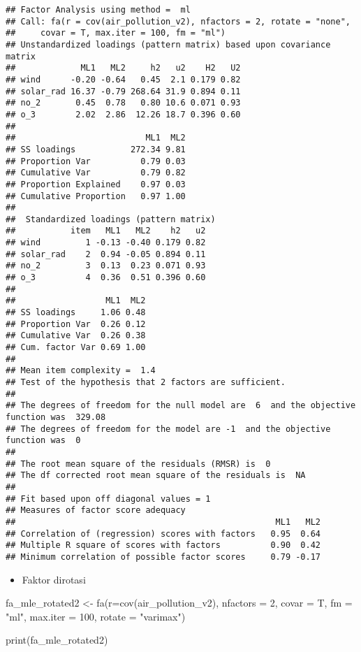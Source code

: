 \documentclass[
]{article}
\newenvironment{Shaded}{\begin{snugshade}}{\end{snugshade}}
\newcommand{\AttributeTok}[1]{\textcolor[rgb]{0.77,0.63,0.00}{#1}}
\newcommand{\DecValTok}[1]{\textcolor[rgb]{0.00,0.00,0.81}{#1}}
\newcommand{\FunctionTok}[1]{\textcolor[rgb]{0.00,0.00,0.00}{#1}}
\newcommand{\NormalTok}[1]{#1}
\newcommand{\OtherTok}[1]{\textcolor[rgb]{0.56,0.35,0.01}{#1}}
\newcommand{\StringTok}[1]{\textcolor[rgb]{0.31,0.60,0.02}{#1}}
\providecommand{\tightlist}{%
  \setlength{\itemsep}{0pt}\setlength{\parskip}{0pt}}
\begin{document}
\begin{verbatim}
## Factor Analysis using method =  ml
## Call: fa(r = cov(air_pollution_v2), nfactors = 2, rotate = "none", 
##     covar = T, max.iter = 100, fm = "ml")
## Unstandardized loadings (pattern matrix) based upon covariance matrix
##             ML1   ML2     h2   u2    H2   U2
## wind      -0.20 -0.64   0.45  2.1 0.179 0.82
## solar_rad 16.37 -0.79 268.64 31.9 0.894 0.11
## no_2       0.45  0.78   0.80 10.6 0.071 0.93
## o_3        2.02  2.86  12.26 18.7 0.396 0.60
## 
##                          ML1  ML2
## SS loadings           272.34 9.81
## Proportion Var          0.79 0.03
## Cumulative Var          0.79 0.82
## Proportion Explained    0.97 0.03
## Cumulative Proportion   0.97 1.00
## 
##  Standardized loadings (pattern matrix)
##           item   ML1   ML2    h2   u2
## wind         1 -0.13 -0.40 0.179 0.82
## solar_rad    2  0.94 -0.05 0.894 0.11
## no_2         3  0.13  0.23 0.071 0.93
## o_3          4  0.36  0.51 0.396 0.60
## 
##                  ML1  ML2
## SS loadings     1.06 0.48
## Proportion Var  0.26 0.12
## Cumulative Var  0.26 0.38
## Cum. factor Var 0.69 1.00
## 
## Mean item complexity =  1.4
## Test of the hypothesis that 2 factors are sufficient.
## 
## The degrees of freedom for the null model are  6  and the objective function was  329.08
## The degrees of freedom for the model are -1  and the objective function was  0 
## 
## The root mean square of the residuals (RMSR) is  0 
## The df corrected root mean square of the residuals is  NA 
## 
## Fit based upon off diagonal values = 1
## Measures of factor score adequacy             
##                                                    ML1   ML2
## Correlation of (regression) scores with factors   0.95  0.64
## Multiple R square of scores with factors          0.90  0.42
## Minimum correlation of possible factor scores     0.79 -0.17
\end{verbatim}

\begin{itemize}
\tightlist
\item
  Faktor dirotasi
\end{itemize}

\begin{Shaded}
\begin{Highlighting}[]
\NormalTok{fa\_mle\_rotated2 }\OtherTok{\textless{}{-}} \FunctionTok{fa}\NormalTok{(}\AttributeTok{r=}\FunctionTok{cov}\NormalTok{(air\_pollution\_v2), }\AttributeTok{nfactors =} \DecValTok{2}\NormalTok{, }\AttributeTok{covar =}\NormalTok{ T, }\AttributeTok{fm =} \StringTok{"ml"}\NormalTok{, }\AttributeTok{max.iter =} \DecValTok{100}\NormalTok{, }\AttributeTok{rotate =} \StringTok{"varimax"}\NormalTok{)}

\FunctionTok{print}\NormalTok{(fa\_mle\_rotated2)}
\end{Highlighting}
\end{Shaded}
\end{document}
